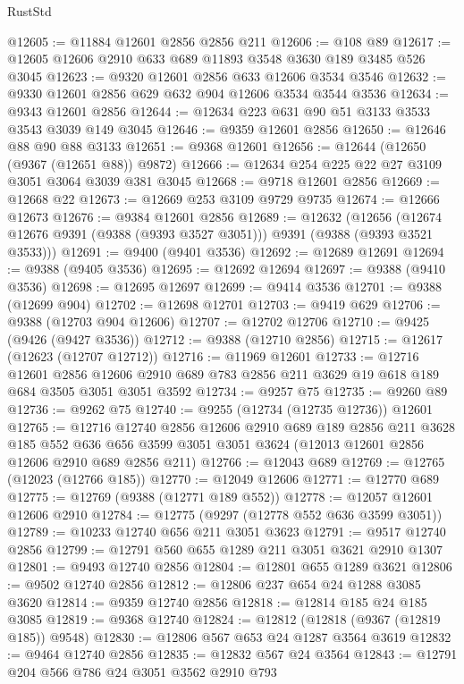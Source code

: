 \begin{lexlean}{RustStd}
\begin{coremodule}
@12605 := @11884 @12601 @2856 @2856 @211
@12606 := @108 @89
@12617 := @12605 @12606 @2910 @633 @689 @11893 @3548 @3630 @189 @3485 @526 @3045
@12623 := @9320 @12601 @2856 @633 @12606 @3534 @3546
@12632 := @9330 @12601 @2856 @629 @632 @904 @12606 @3534 @3544 @3536
@12634 := @9343 @12601 @2856
@12644 := @12634 @223 @631 @90 @51 @3133 @3533 @3543 @3039 @149 @3045
@12646 := @9359 @12601 @2856
@12650 := @12646 @88 @90 @88 @3133
@12651 := @9368 @12601
@12656 := @12644 (@12650 (@9367 (@12651 @88)) @9872)
@12666 := @12634 @254 @225 @22 @27 @3109 @3051 @3064 @3039 @381 @3045
@12668 := @9718 @12601 @2856
@12669 := @12668 @22
@12673 := @12669 @253 @3109 @9729 @9735
@12674 := @12666 @12673
@12676 := @9384 @12601 @2856
@12689 := @12632
    (@12656 (@12674 @12676 @9391 (@9388 (@9393 @3527 @3051))) @9391 (@9388 (@9393 @3521 @3533)))
@12691 := @9400 (@9401 @3536)
@12692 := @12689 @12691
@12694 := @9388 (@9405 @3536)
@12695 := @12692 @12694
@12697 := @9388 (@9410 @3536)
@12698 := @12695 @12697
@12699 := @9414 @3536
@12701 := @9388 (@12699 @904)
@12702 := @12698 @12701
@12703 := @9419 @629
@12706 := @9388 (@12703 @904 @12606)
@12707 := @12702 @12706
@12710 := @9425 (@9426 (@9427 @3536))
@12712 := @9388 (@12710 @2856)
@12715 := @12617 (@12623 (@12707 @12712))
@12716 := @11969 @12601
@12733 := @12716
    @12601
    @2856
    @12606
    @2910
    @689
    @783
    @2856
    @211
    @3629
    @19
    @618
    @189
    @684
    @3505
    @3051
    @3051
    @3592
@12734 := @9257 @75
@12735 := @9260 @89
@12736 := @9262 @75
@12740 := @9255 (@12734 (@12735 @12736)) @12601
@12765 := @12716
    @12740
    @2856
    @12606
    @2910
    @689
    @189
    @2856
    @211
    @3628
    @185
    @552
    @636
    @656
    @3599
    @3051
    @3051
    @3624
    (@12013 @12601 @2856 @12606 @2910 @689 @2856 @211)
@12766 := @12043 @689
@12769 := @12765 (@12023 (@12766 @185))
@12770 := @12049 @12606
@12771 := @12770 @689
@12775 := @12769 (@9388 (@12771 @189 @552))
@12778 := @12057 @12601 @12606 @2910
@12784 := @12775 (@9297 (@12778 @552 @636 @3599 @3051))
@12789 := @10233 @12740 @656 @211 @3051 @3623
@12791 := @9517 @12740 @2856
@12799 := @12791 @560 @655 @1289 @211 @3051 @3621 @2910 @1307
@12801 := @9493 @12740 @2856
@12804 := @12801 @655 @1289 @3621
@12806 := @9502 @12740 @2856
@12812 := @12806 @237 @654 @24 @1288 @3085 @3620
@12814 := @9359 @12740 @2856
@12818 := @12814 @185 @24 @185 @3085
@12819 := @9368 @12740
@12824 := @12812 (@12818 (@9367 (@12819 @185)) @9548)
@12830 := @12806 @567 @653 @24 @1287 @3564 @3619
@12832 := @9464 @12740 @2856
@12835 := @12832 @567 @24 @3564
@12843 := @12791 @204 @566 @786 @24 @3051 @3562 @2910 @793

\end{coremodule}
\end{lexlean}
